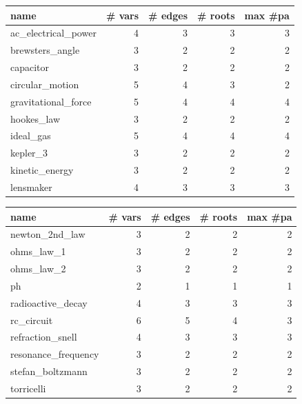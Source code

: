 \begin{tabular}{lrrrr}
\toprule
name & \# vars & \# edges & \# roots & max \#pa \\
\midrule
ac\_electrical\_power & 4 & 3 & 3 & 3 \\
brewsters\_angle & 3 & 2 & 2 & 2 \\
capacitor & 3 & 2 & 2 & 2 \\
circular\_motion & 5 & 4 & 3 & 2 \\
gravitational\_force & 5 & 4 & 4 & 4 \\
hookes\_law & 3 & 2 & 2 & 2 \\
ideal\_gas & 5 & 4 & 4 & 4 \\
kepler\_3 & 3 & 2 & 2 & 2 \\
kinetic\_energy & 3 & 2 & 2 & 2 \\
lensmaker & 4 & 3 & 3 & 3 \\
\bottomrule
\end{tabular}

\begin{tabular}{lrrrr}
\toprule
name & \# vars & \# edges & \# roots & max \#pa \\
\midrule
newton\_2nd\_law & 3 & 2 & 2 & 2 \\
ohms\_law\_1 & 3 & 2 & 2 & 2 \\
ohms\_law\_2 & 3 & 2 & 2 & 2 \\
ph & 2 & 1 & 1 & 1 \\
radioactive\_decay & 4 & 3 & 3 & 3 \\
rc\_circuit & 6 & 5 & 4 & 3 \\
refraction\_snell & 4 & 3 & 3 & 3 \\
resonance\_frequency & 3 & 2 & 2 & 2 \\
stefan\_boltzmann & 3 & 2 & 2 & 2 \\
torricelli & 3 & 2 & 2 & 2 \\
\bottomrule
\end{tabular}